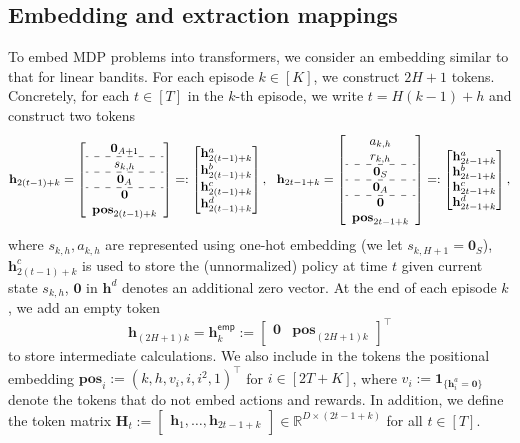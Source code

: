 \documentclass[10pt]{article}
\newcommand{\<}{\left\langle}
\renewcommand{\>}{\right\rangle}
\newcommand{\bzero}{{\mathbf 0}}
\newcommand{\bone}{{\mathbf 1}}
\newcommand{\R}{\mathbb{R}}
\newcommand{\posv}{{\mathbf{pos}}}
\newcommand{\parta}{{a}}
\newcommand{\partb}{{b}}
\newcommand{\partc}{{c}}
\newcommand{\partd}{{d}}
\newcommand{\state}{{s}}
\newcommand{\action}{{a}}
\newcommand{\reward}{{r}}
\newcommand{\totlen}{{T}}
\newcommand{\Numepi}{{K}}
\newcommand{\horizon}{{H}}
\renewcommand{\horizon}{{H}}
\newcommand{\Numst}{{S}}
\newcommand{\Numact}{{A}}
\newcommand{\oddeven}{{v}}
\newcommand{\emp}{{\mathsf{emp}}}
\def\bH{{\mathbf H}}
\def\bh{{\mathbf h}}
\begin{document}
\subsection{Embedding and extraction mappings}\label{sec:tf_embed_mdp}
To embed MDP problems into transformers, we consider an embedding similar to that for linear bandits. For each episode $k\in[\Numepi]$, we construct $2\horizon+1$ tokens. Concretely, for each $t\in[\totlen]$ in the $k$-th episode, we write  $t=\horizon(k-1)+h$  and construct two tokens
\[
\begin{aligned}
\bh_{2(t-1)+k}=
\left[
\begin{array}{cc}
     \bzero_{\Numact+1} \\
     \hdashline
     \state_{k,h}\\
      \hdashline
    \bzero_{\Numact}\\
    \hdashline
    \bzero\\
    \posv_{2(t-1)+k}
\end{array}\right]
=:
\begin{bmatrix}
     \bh_{2(t-1)+k}^{\parta} \\  \bh_{2(t-1)+k}^{\partb}\\  \bh_{2(t-1)+k}^{\partc}\\   \bh_{2(t-1)+k}^{\partd}\\
\end{bmatrix},~~
\bh_{2t-1+k}=
\left[
\begin{array}{cc}
     \action_{k,h} \\
      \reward_{k,h}\\
      \hdashline
      \bzero_{\Numst}\\
      \hdashline
      \bzero_{\Numact}\\
     \hdashline
      \bzero\\
      \posv_{2t-1+k}
\end{array}\right]=:
\begin{bmatrix}
    \bh_{2t-1+k}^{\parta} \\  \bh_{2t-1+k}^{\partb}\\   \bh_{2t-1+k}^{\partc}\\   \bh_{2t-1+k}^{\partd}
\end{bmatrix},
\end{aligned}
\]
where  $\state_{k,h},\action_{k,h}$ are represented using one-hot embedding (we let $\state_{k,\horizon+1}=\bzero_\Numst$), $\bh^\partc_{2(t-1)+k}$ is used to store the (unnormalized)  policy at time  $t$ given current state $\state_{k,h}$, $\bzero$ in $\bh^\partd$ denotes an additional zero vector. At the end of each episode $k$, we add an empty token
$$
\bh_{(2\horizon+1)k}=\bh^{\emp}_{k}:=\begin{bmatrix}
    \bzero &\posv_{(2\horizon+1)k}
\end{bmatrix}^\top
$$ to store intermediate calculations. We also include in the tokens  the positional embedding $\posv_i:=(k,h,v_i,i,i^2,1)^\top$ for $i\in[2\totlen+\Numepi]$, where $\oddeven_i:=\bone_{\{\bh_i^\parta=\bzero\}}$  denote the tokens that do not embed actions and rewards.    In addition, we define  the token matrix $\bH_t:=\begin{bmatrix}
    \bh_1,\ldots,\bh_{2t-1+k}
\end{bmatrix}\in\R^{D\times (2t-1+k)}$ for all $t\in[\totlen]$.
\end{document}
